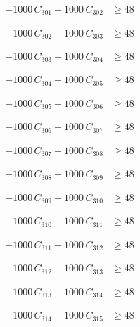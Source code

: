 \documentclass[a4paper,11pt]{article}
\begin{document}
\begin{align}
-1000\,C_{301} + 1000\,C_{302} &\geq 48 \nonumber
\end{align}

\begin{align}
-1000\,C_{302} + 1000\,C_{303} &\geq 48 \nonumber
\end{align}

\begin{align}
-1000\,C_{303} + 1000\,C_{304} &\geq 48 \nonumber
\end{align}

\begin{align}
-1000\,C_{304} + 1000\,C_{305} &\geq 48 \nonumber
\end{align}

\begin{align}
-1000\,C_{305} + 1000\,C_{306} &\geq 48 \nonumber
\end{align}

\begin{align}
-1000\,C_{306} + 1000\,C_{307} &\geq 48 \nonumber
\end{align}

\begin{align}
-1000\,C_{307} + 1000\,C_{308} &\geq 48 \nonumber
\end{align}

\begin{align}
-1000\,C_{308} + 1000\,C_{309} &\geq 48 \nonumber
\end{align}

\begin{align}
-1000\,C_{309} + 1000\,C_{310} &\geq 48 \nonumber
\end{align}

\begin{align}
-1000\,C_{310} + 1000\,C_{311} &\geq 48 \nonumber
\end{align}

\begin{align}
-1000\,C_{311} + 1000\,C_{312} &\geq 48 \nonumber
\end{align}

\begin{align}
-1000\,C_{312} + 1000\,C_{313} &\geq 48 \nonumber
\end{align}

\begin{align}
-1000\,C_{313} + 1000\,C_{314} &\geq 48 \nonumber
\end{align}

\begin{align}
-1000\,C_{314} + 1000\,C_{315} &\geq 48 \nonumber
\end{align}
\end{document}
